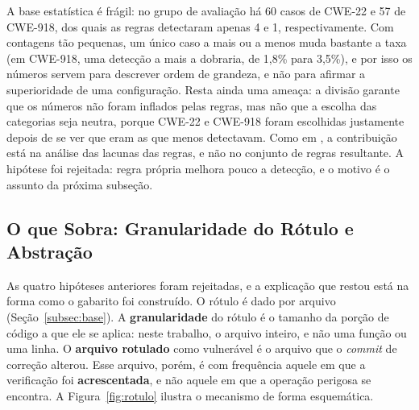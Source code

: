 A base estatística é frágil: no grupo de avaliação há 60 casos de CWE-22 e 57 de CWE-918, dos quais as regras detectaram apenas 4 e 1, respectivamente. Com contagens tão pequenas, um único caso a mais ou a menos muda bastante a taxa (em CWE-918, uma detecção a mais a dobraria, de 1,8\% para 3,5\%), e por isso os números servem para descrever ordem de grandeza, e não para afirmar a superioridade de uma configuração. Resta ainda uma ameaça: a divisão garante que os números não foram inflados pelas regras, mas não que a escolha das categorias seja neutra, porque CWE-22 e CWE-918 foram escolhidas justamente depois de se ver que eram as que menos detectavam. Como em , a contribuição está na análise das lacunas das regras, e não no conjunto de regras resultante. A hipótese foi rejeitada: regra própria melhora pouco a detecção, e o motivo é o assunto da próxima subseção.

\subsection{O que Sobra: Granularidade do Rótulo e Abstração}
\label{subsec:sobra}

As quatro hipóteses anteriores foram rejeitadas, e a explicação que restou está na forma como o gabarito foi construído. O rótulo é dado por arquivo (Seção~\ref{subsec:base}). A \textbf{granularidade} do rótulo é o tamanho da porção de código a que ele se aplica: neste trabalho, o arquivo inteiro, e não uma função ou uma linha. O \textbf{arquivo rotulado} como vulnerável é o arquivo que o \textit{commit} de correção alterou. Esse arquivo, porém, é com frequência aquele em que a verificação foi \textbf{acrescentada}, e não aquele em que a operação perigosa se encontra. A Figura~\ref{fig:rotulo} ilustra o mecanismo de forma esquemática.

